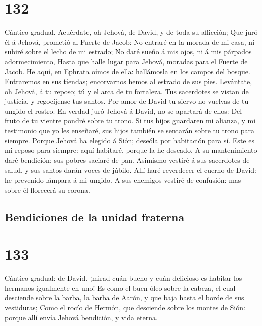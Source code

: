 \hypertarget{section-131}{%
\section{132}\label{section-131}}

 Cántico gradual. Acuérdate, oh Jehová, de David, y de
toda su aflicción;  Que juró él á Jehová, prometió al
Fuerte de Jacob:  No entraré en la morada de mi casa, ni
subiré sobre el lecho de mi estrado;  No daré sueño á mis
ojos, ni á mis párpados adormecimiento,  Hasta que halle
lugar para Jehová, moradas para el Fuerte de Jacob.  He
aquí, en Ephrata oímos de ella: hallámosla en los campos del bosque.
 Entraremos en sus tiendas; encorvarnos hemos al estrado
de sus pies.  Levántate, oh Jehová, á tu reposo; tú y el
arca de tu fortaleza.  Tus sacerdotes se vistan de
justicia, y regocíjense tus santos.  Por amor de David tu
siervo no vuelvas de tu ungido el rostro.  En verdad juró
Jehová á David, no se apartará de ellos: Del fruto de tu vientre pondré
sobre tu trono.  Si tus hijos guardaren mi alianza, y mi
testimonio que yo les enseñaré, sus hijos también se sentarán sobre tu
trono para siempre.  Porque Jehová ha elegido á Sión;
deseóla por habitación para sí.  Este es mi reposo para
siempre: aquí habitaré, porque la he deseado.  A su
mantenimiento daré bendición: sus pobres saciaré de pan. 
Asimismo vestiré á sus sacerdotes de salud, y sus santos darán voces de
júbilo.  Allí haré reverdecer el cuerno de David: he
prevenido lámpara á mi ungido.  A sus enemigos vestiré de
confusión: mas sobre él florecerá su corona.

\hypertarget{bendiciones-de-la-unidad-fraterna}{%
\subsection{Bendiciones de la unidad
fraterna}\label{bendiciones-de-la-unidad-fraterna}}

\hypertarget{section-132}{%
\section{133}\label{section-132}}

 Cántico gradual: de David. ¡mirad cuán bueno y cuán
delicioso es habitar los hermanos igualmente en uno!  Es
como el buen óleo sobre la cabeza, el cual desciende sobre la barba, la
barba de Aarón, y que baja hasta el borde de sus vestiduras;
 Como el rocío de Hermón, que desciende sobre los montes
de Sión: porque allí envía Jehová bendición, y vida eterna.

